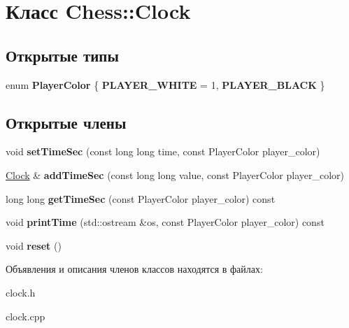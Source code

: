\hypertarget{class_chess_1_1_clock}{}\section{Класс Chess\+:\+:Clock}
\label{class_chess_1_1_clock}
\subsection*{Открытые типы}
\begin{DoxyCompactItemize}
\item 
\mbox{\label{class_chess_1_1_clock_a043cae508eb20b95269121cf2a242fb5}} 
enum {\bfseries Player\+Color} \{ {\bfseries P\+L\+A\+Y\+E\+R\+\_\+\+W\+H\+I\+TE} = 1, 
{\bfseries P\+L\+A\+Y\+E\+R\+\_\+\+B\+L\+A\+CK}
 \}
\end{DoxyCompactItemize}
\subsection*{Открытые члены}
\begin{DoxyCompactItemize}
\item 
\mbox{\label{class_chess_1_1_clock_adac346380d40d59ac4c12fde8176ea58}} 
void {\bfseries set\+Time\+Sec} (const long long time, const Player\+Color player\+\_\+color)
\item 
\mbox{\label{class_chess_1_1_clock_a9d724505115b54ccca5832d3dddc9570}} 
\mbox{\hyperlink{class_chess_1_1_clock}{Clock}} \& {\bfseries add\+Time\+Sec} (const long long value, const Player\+Color player\+\_\+color)
\item 
\mbox{\label{class_chess_1_1_clock_ab113c85d844a690807d096c3a84244c8}} 
long long {\bfseries get\+Time\+Sec} (const Player\+Color player\+\_\+color) const
\item 
\mbox{\label{class_chess_1_1_clock_a94c24e8e2d7c53bcfa880d9201268332}} 
void {\bfseries print\+Time} (std\+::ostream \&os, const Player\+Color player\+\_\+color) const
\item 
\mbox{\label{class_chess_1_1_clock_a0ab5423b0a997aa13d7b6131c46d1358}} 
void {\bfseries reset} ()
\end{DoxyCompactItemize}


Объявления и описания членов классов находятся в файлах\+:\begin{DoxyCompactItemize}
\item 
clock.\+h\item 
clock.\+cpp\end{DoxyCompactItemize}
